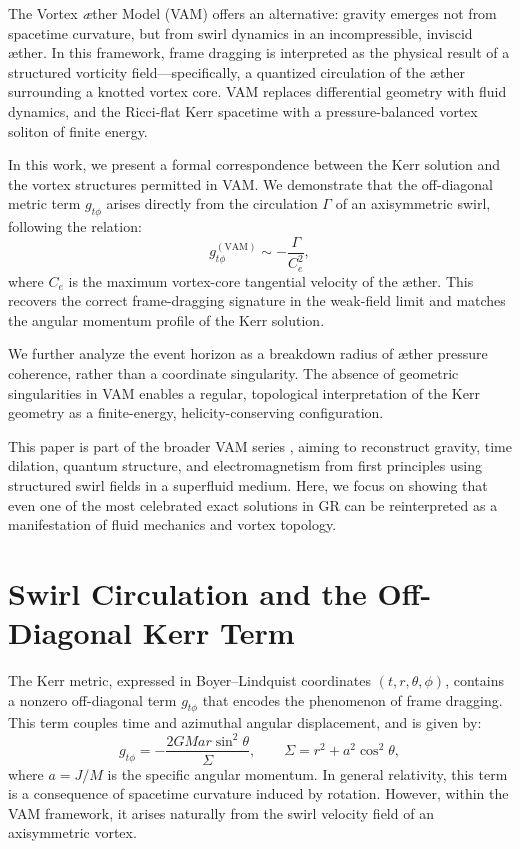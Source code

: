\documentclass[twocolumn,aps,pre,floatfix,nofootinbib]{revtex4-2}
\begin{document}
    The Vortex \textit{\ae}ther Model (VAM) \cite{Iskandarani2025a,Iskandarani2025b,Iskandarani2025c} offers an alternative: gravity emerges not from spacetime curvature, but from swirl dynamics in an incompressible, inviscid æther. In this framework, frame dragging is interpreted as the physical result of a structured vorticity field—specifically, a quantized circulation of the æther surrounding a knotted vortex core. VAM replaces differential geometry with fluid dynamics, and the Ricci-flat Kerr spacetime with a pressure-balanced vortex soliton of finite energy.

    In this work, we present a formal correspondence between the Kerr solution and the vortex structures permitted in VAM. We demonstrate that the off-diagonal metric term \( g_{t\phi} \) arises directly from the circulation \( \Gamma \) of an axisymmetric swirl, following the relation:
    \[
        g_{t\phi}^{(\text{VAM})} \sim -\frac{\Gamma}{C_e^2},
    \]
    where \( C_e \) is the maximum vortex-core tangential velocity of the æther. This recovers the correct frame-dragging signature in the weak-field limit and matches the angular momentum profile of the Kerr solution.

    We further analyze the event horizon as a breakdown radius of æther pressure coherence, rather than a coordinate singularity. The absence of geometric singularities in VAM enables a regular, topological interpretation of the Kerr geometry as a finite-energy, helicity-conserving configuration.

    This paper is part of the broader VAM series \cite{Iskandarani2025a,Iskandarani2025b,Iskandarani2025c,Iskandarani2025d,Iskandarani2025e,Iskandarani2025f}, aiming to reconstruct gravity, time dilation, quantum structure, and electromagnetism from first principles using structured swirl fields in a superfluid medium. Here, we focus on showing that even one of the most celebrated exact solutions in GR can be reinterpreted as a manifestation of fluid mechanics and vortex topology.





    \section{Swirl Circulation and the Off-Diagonal Kerr Term}

    The Kerr metric, expressed in Boyer--Lindquist coordinates $(t, r, \theta, \phi)$, contains a nonzero off-diagonal term $g_{t\phi}$ that encodes the phenomenon of frame dragging. This term couples time and azimuthal angular displacement, and is given by:
    \begin{equation}
        g_{t\phi} = -\frac{2 G M a r \sin^2\theta}{\Sigma}, \qquad \Sigma = r^2 + a^2 \cos^2\theta,
    \end{equation}
    where $a = J/M$ is the specific angular momentum. In general relativity, this term is a consequence of spacetime curvature induced by rotation. However, within the VAM framework, it arises naturally from the swirl velocity field of an axisymmetric vortex.
\end{document}
